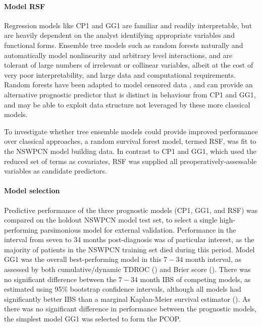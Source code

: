 \documentclass[dissertation.tex]{subfiles}
\begin{document}
\paragraph{Model RSF}
Regression models like CP1 and GG1 are familiar and readily interpretable, but are heavily dependent on the analyst identifying appropriate variables and functional forms.  Ensemble tree models such as random forests \cite{Breiman2001} naturally and automatically model nonlinearity and arbitrary level interactions, and are tolerant of large numbers of irrelevant or collinear variables, albeit at the cost of very poor interpretability, and large data and computational requirements.  Random forests have been adapted to model censored data \cite{Ishwaran2008}, and can provide an alternative prognostic predictor that is distinct in behaviour from CP1 and GG1, and may be able to exploit data structure not leveraged by these more classical models.

To investigate whether tree ensemble models could provide improved performance over classical approaches, a random survival forest model, termed RSF, was fit to the \gls{NSWPCN} model building data.  In contrast to CP1 and GG1, which used the reduced set of terms as covariates, RSF was supplied all preoperatively-assessable variables as candidate predictors.

\paragraph{Model selection}
Predictive performance of the three prognostic models (CP1, GG1, and RSF) was compared on the holdout \gls{NSWPCN} model test set, to select a single high-performing parsimonious model for external validation.  Performance in the interval from seven to 34 months post-diagnosis was of particular interest, as the majority of patients in the \gls{NSWPCN} training set died during this period.  Model GG1 was the overall best-performing model in this $7-34$ month interval, as assessed by both cumulative/dynamic \gls{TDROC} \cite{Blanche2013} () and Brier score \cite{Graf1999} ().  There was no significant difference between the $7-34$ month \gls{IBS} of competing models, as estimated using 95\% bootstrap confidence intervals, although all models had significantly better \gls{IBS} than a marginal Kaplan-Meier survival estimator ().
As there was no significant difference in performance between the prognostic models, the simplest model GG1 was selected to form the \gls{PCOP}.
\end{document}
